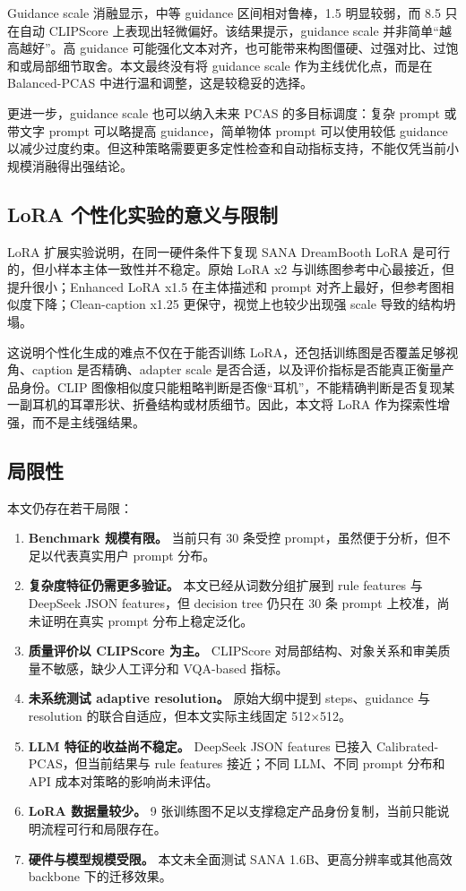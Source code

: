 \documentclass[UTF8,zihao=-4,fontset=fandol]{ctexart}
\newcommand{\clipscore}{\textrm{CLIPScore}}
\begin{document}
Guidance scale 消融显示，中等 guidance 区间相对鲁棒，1.5 明显较弱，而 8.5 只在自动 \clipscore{} 上表现出轻微偏好。该结果提示，guidance scale 并非简单“越高越好”。高 guidance 可能强化文本对齐，也可能带来构图僵硬、过强对比、过饱和或局部细节取舍。本文最终没有将 guidance scale 作为主线优化点，而是在 Balanced-PCAS 中进行温和调整，这是较稳妥的选择。

更进一步，guidance scale 也可以纳入未来 PCAS 的多目标调度：复杂 prompt 或带文字 prompt 可以略提高 guidance，简单物体 prompt 可以使用较低 guidance 以减少过度约束。但这种策略需要更多定性检查和自动指标支持，不能仅凭当前小规模消融得出强结论。

\subsection{LoRA 个性化实验的意义与限制}

LoRA 扩展实验说明，在同一硬件条件下复现 SANA DreamBooth LoRA 是可行的，但小样本主体一致性并不稳定。原始 LoRA x2 与训练图参考中心最接近，但提升很小；Enhanced LoRA x1.5 在主体描述和 prompt 对齐上最好，但参考图相似度下降；Clean-caption x1.25 更保守，视觉上也较少出现强 scale 导致的结构坍塌。

这说明个性化生成的难点不仅在于能否训练 LoRA，还包括训练图是否覆盖足够视角、caption 是否精确、adapter scale 是否合适，以及评价指标是否能真正衡量产品身份。CLIP 图像相似度只能粗略判断是否像“耳机”，不能精确判断是否复现某一副耳机的耳罩形状、折叠结构或材质细节。因此，本文将 LoRA 作为探索性增强，而不是主线强结果。

\subsection{局限性}

本文仍存在若干局限：
\begin{enumerate}
  \item \textbf{Benchmark 规模有限。} 当前只有 30 条受控 prompt，虽然便于分析，但不足以代表真实用户 prompt 分布。
  \item \textbf{复杂度特征仍需更多验证。} 本文已经从词数分组扩展到 rule features 与 DeepSeek JSON features，但 decision tree 仍只在 30 条 prompt 上校准，尚未证明在真实 prompt 分布上稳定泛化。
  \item \textbf{质量评价以 CLIPScore 为主。} CLIPScore 对局部结构、对象关系和审美质量不敏感，缺少人工评分和 VQA-based 指标。
  \item \textbf{未系统测试 adaptive resolution。} 原始大纲中提到 steps、guidance 与 resolution 的联合自适应，但本文实际主线固定 512$\times$512。
  \item \textbf{LLM 特征的收益尚不稳定。} DeepSeek JSON features 已接入 Calibrated-PCAS，但当前结果与 rule features 接近；不同 LLM、不同 prompt 分布和 API 成本对策略的影响尚未评估。
  \item \textbf{LoRA 数据量较少。} 9 张训练图不足以支撑稳定产品身份复制，当前只能说明流程可行和局限存在。
  \item \textbf{硬件与模型规模受限。} 本文未全面测试 SANA 1.6B、更高分辨率或其他高效 backbone 下的迁移效果。
\end{enumerate}
\end{document}
